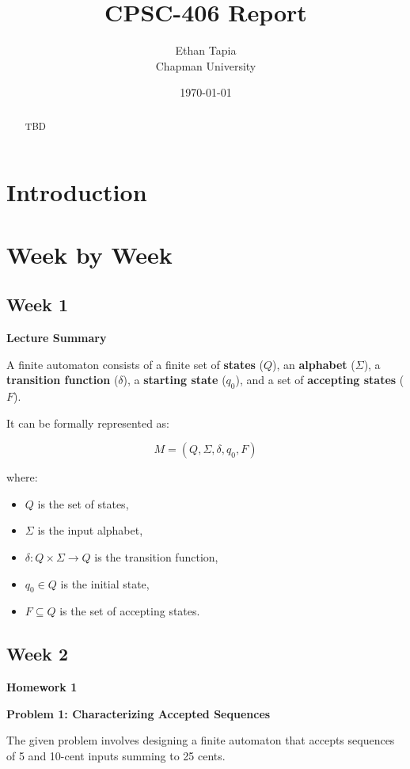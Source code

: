 \documentclass{article}
\title{CPSC-406 Report}
\author{Ethan Tapia  \\ Chapman University}
\date{\today}
\theoremstyle{theorem}
\theoremstyle{definition}
\theoremstyle{remark}
\begin{document}
\maketitle

\begin{abstract}
TBD
\end{abstract}

\setcounter{tocdepth}{3}
\tableofcontents

\section{Introduction}\label{intro}


\section{Week by Week}\label{homework}

\subsection{Week 1}
\textbf{Lecture Summary}

A finite automaton consists of a finite set of \textbf{states} ($Q$), an \textbf{alphabet} ($\Sigma$), a \textbf{transition function} ($\delta$), a \textbf{starting state} ($q_0$), and a set of \textbf{accepting states} ($F$). 

It can be formally represented as:

\[
M = (Q, \Sigma, \delta, q_0, F)
\]

where:
\begin{itemize}
    \item $Q$ is the set of states,
    \item $\Sigma$ is the input alphabet,
    \item $\delta: Q \times \Sigma \to Q$ is the transition function,
    \item $q_0 \in Q$ is the initial state,
    \item $F \subseteq Q$ is the set of accepting states.
\end{itemize}



\subsection{Week 2}
{\textbf{{Homework 1}}}

\textbf{Problem 1: Characterizing Accepted Sequences}

The given problem involves designing a finite automaton that accepts sequences of 5 and 10-cent inputs summing to 25 cents.
\end{document}
